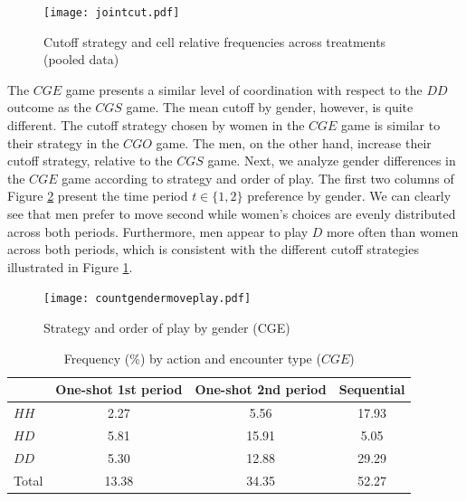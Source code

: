 \documentclass[11pt, letterpaper]{article}
\theoremstyle{plain}
\begin{document}
\begin{center}
\begin{figure}[ht]
\centering{}%
\texttt{[image: jointcut.pdf]}%
\caption{Cutoff strategy and cell relative frequencies across treatments (pooled data)} 
\label{fig:cutpooled}
\end{figure}
\par\end{center}

The $CGE$ game presents a similar level of coordination with respect to the $DD$ outcome as the $CGS$ game. The mean cutoff by gender, however, is quite different. The cutoff strategy chosen by women in the $CGE$ game is similar to their strategy in the $CGO$ game. The men, on the other hand, increase their cutoff strategy, relative to the $CGS$ game. Next, we analyze gender differences in the $CGE$ game according to strategy and order of play. The first two columns of Figure \ref{fig:cgepooled} present the time period $t\in\{1,2\}$ preference by gender. We can clearly see that men prefer to move second while women's choices are evenly distributed across both periods. Furthermore, men appear to play $D$ more often than women across both periods, which is consistent with the different cutoff strategies illustrated in Figure \ref{fig:cutpooled}.


\begin{center}
\begin{figure}[ht]
\centering{}%
\texttt{[image: countgendermoveplay.pdf]}%
\caption{Strategy and order of play by gender (CGE)} 
\label{fig:cgepooled}
\end{figure}
\end{center}


\begin{table}[ht]
\centering\caption{Frequency (\%) by action and encounter type ($CGE$)}

\begin{tabular}{lccc}
\hline
 & One-shot 1st period & One-shot 2nd period  & Sequential\\
  \hline
  $HH$ &  2.27 & 5.56 & 17.93 \\
  $HD$ & 5.81 & 15.91 & 5.05 \\
  $DD$& 5.30 & 12.88 & 29.29 \\
  \hline
Total & 13.38 & 34.35 & 52.27\\
\end{tabular}

\label{tab(CGE)}
\end{table}
\end{document}
